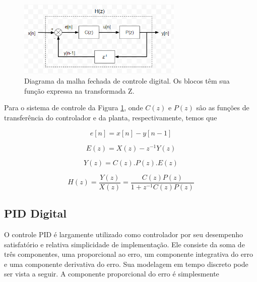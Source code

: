 \begin{figure}[ht]
    \begin{center}
    \includegraphics[width=0.7\textwidth]{figuras/condig.PNG}
    \end{center}
    \caption[Diagrama da malha fechada de controle digital.]{Diagrama da malha fechada de controle digital. Os blocos têm sua função expressa na transformada Z.}
    \label{condig}
\end{figure}

Para o sistema de controle da Figura \ref{condig}, onde $C(z)$ e $P(z)$ sâo as funções de transferência do controlador e da planta, respectivamente, temos que

\begin{equation}
    \label{eq:cd_2}
    e[n] = x[n] - y[n-1]
\end{equation}

\begin{equation}
    \label{eq:cd_3}
    E(z) = X(z) - z^{-1}Y(z)
\end{equation}

\begin{equation}
    \label{eq:cd_4}
    Y(z) = C(z).P(z).E(z)
\end{equation}

\begin{equation}
    \label{eq:cd_5}
    H(z) = \frac{Y(z)}{X(z)} = \frac{C(z)P(z)}{1+z^{-1}C(z)P(z)}
\end{equation}

\subsection{PID Digital}

O controle \acf{PID} é largamente utilizado como controlador por seu desempenho satisfatório e relativa simplicidade de implementação. Ele consiste da soma de três componentes, uma proporcional ao erro, um componente integrativa do erro e uma componente derivativa do erro. Sua modelagem em tempo discreto pode ser vista a seguir. A componente proporcional do erro é simplesmente

